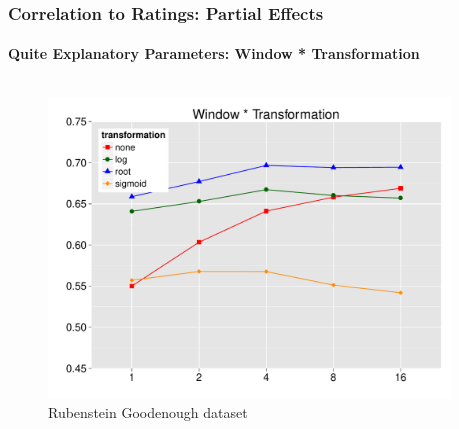 \documentclass[t]{beamer} %
\begin{document}
\begin{frame}
  \frametitle{Correlation to Ratings: Partial Effects}
  \framesubtitle{Quite Explanatory Parameters: Window * Transformation}

  \vspace{-18pt}

  \begin{columns}
    
    \begin{column}{0.5\textwidth}
      \begin{figure} 
        \hspace*{-18pt} 
        \includegraphics[scale=0.30]{img/lapesa_rg_main_window_transformation}
        \vspace{-10pt}
        \caption{Rubenstein Goodenough dataset}
      \end{figure}
    \end{column}

    \begin{column}{0.5\textwidth}
      \centering
      

\end{column}
\end{columns}
\end{frame}
\end{document}
